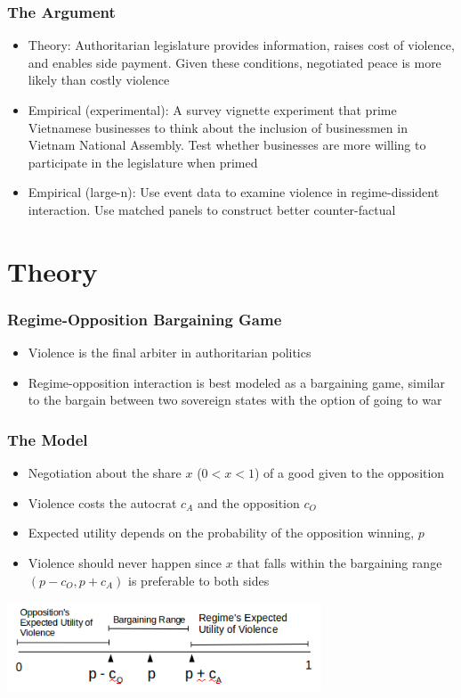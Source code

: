 \documentclass{beamer}
\begin{document}
\begin{frame}
\frametitle{The Argument}
\begin{itemize}
\item<1-> Theory: Authoritarian legislature provides information, raises cost of violence, and enables side payment. Given these conditions, negotiated peace is more likely than costly violence
\item<2-> Empirical (experimental): A survey vignette experiment that prime Vietnamese businesses to think about the inclusion of businessmen in Vietnam National Assembly. Test whether businesses are more willing to participate in the legislature when primed
\item<3-> Empirical (large-n): Use event data to examine violence in regime-dissident interaction. Use matched panels to construct better counter-factual
\end{itemize}
\end{frame}


\section{Theory}
\begin{frame}
\frametitle{Regime-Opposition Bargaining Game}
\begin{itemize}
\item Violence is the final arbiter in authoritarian politics
\item Regime-opposition interaction is best modeled as a bargaining game, similar to the bargain between two sovereign states with the option of going to war
\end{itemize}
\end{frame}

\begin{frame}
\frametitle{The Model}
\centering
\begin{itemize}
\item Negotiation about the share $x$ ($0 < x < 1$) of a good given to the opposition
\item Violence costs the autocrat $c_A$ and the opposition $c_O$
\item Expected utility depends on the probability of the opposition winning, $p$
\item<2-> Violence should never happen since $x$ that falls within the bargaining range $(p - c_O, p + c_A)$ is preferable to both sides
\end{itemize}
\includegraphics[width=0.7\textwidth]{general_model}
\end{frame}
\end{document}
